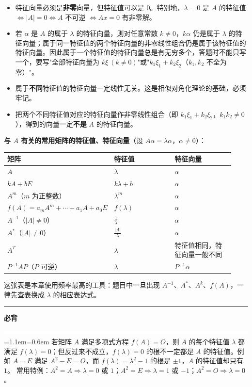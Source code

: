 \documentclass[11pt,openany,UTF8]{ctexbook}
\newcommand{\callouthead}[2]{%
  \par\addvspace{7pt}\noindent
  {\color{#1}\rule[-0.15em]{3pt}{1.05em}}\hspace{0.5em}%
  {\bfseries\color{#1}#2}\par\nobreak\vspace{-0.35em}%
  {\color{rulesep}\hrule height 0.4pt}\nobreak\vspace{0.45em}%
  \begingroup\small\setlength{\parindent}{0pt}%
  \leftskip=1.1em\rightskip=0.6em\noindent\ignorespaces}
\newcommand{\calloutend}{\par\endgroup\addvspace{7pt}}
\newenvironment{callkey}[1]{\callouthead{keybar}{#1}}{\calloutend}
\begin{document}
\begin{itemize}
\item 特征向量必须是\textbf{非零}向量，但特征值可以是 $0$。特别地，$\lambda=0$ 是 $A$ 的特征值 $\iff\vert A\vert=0\iff A$ 不可逆 $\iff Ax=0$ 有非零解。
\item 若 $\alpha$ 是 $A$ 的属于 $\lambda$ 的特征向量，则对任意常数 $k\neq0$，$k\alpha$ 仍是属于 $\lambda$ 的特征向量；属于同一特征值的两个特征向量的非零线性组合仍是属于该特征值的特征向量。因此属于一个特征值的特征向量总是有无穷多个，答题时不能只写一个，要写"全部特征向量为 $k\xi\ (k\neq0)$"或"$k_1\xi_1+k_2\xi_2$（$k_1,k_2$ 不全为零）"。
\item 属于\textbf{不同}特征值的特征向量一定线性无关。这是相似对角化理论的基础，必须牢记。
\item 把两个不同特征值对应的特征向量作非零线性组合（即 $k_1\xi_1+k_2\xi_2$，$k_1k_2\neq0$），得到的向量一定\textbf{不是} $A$ 的特征向量。
\end{itemize}
\textbf{与 $A$ 有关的常用矩阵的特征值、特征向量}（设 $A\alpha=\lambda\alpha$，$\alpha\neq0$）：

\begingroup\small\setlength{\tabcolsep}{4.0pt}
\begin{longtable}{@{}L{0.3095\linewidth}L{0.3095\linewidth}L{0.3095\linewidth}@{}}
\toprule
\textbf{矩阵} & \textbf{特征值} & \textbf{特征向量} \\
\midrule
\endhead
$A$ & $\lambda$ & $\alpha$ \\
$kA+bE$ & $k\lambda+b$ & $\alpha$ \\
$A^m$（$m$ 为正整数） & $\lambda^m$ & $\alpha$ \\
$f(A)=a_mA^m+\cdots+a_1A+a_0E$ & $f(\lambda)$ & $\alpha$ \\
$A^{-1}$（$\vert A\vert\neq0$） & $\frac{1}{\lambda}$ & $\alpha$ \\
$A^*$（$\vert A\vert\neq0$） & $\frac{\vert A\vert}{\lambda}$ & $\alpha$ \\
$A^T$ & $\lambda$ & 特征值相同，特征向量一般不同 \\
$P^{-1}AP$（$P$ 可逆） & $\lambda$ & $P^{-1}\alpha$ \\
\bottomrule
\end{longtable}
\endgroup

这张表是本章使用频率最高的工具：题目中一旦出现 $A^{-1}$、$A^*$、$A^k$、$f(A)$，一律先查表换成 $\lambda$ 的相应表达式。

\begin{callkey}{必背}
若矩阵 $A$ 满足多项式方程 $f(A)=O$，则 $A$ 的每个特征值 $\lambda$ 都满足 $f(\lambda)=0$；但反过来不成立，$f(\lambda)=0$ 的根不一定都是 $A$ 的特征值。例如 $A=E$ 满足 $A^2-E=O$，而 $f(\lambda)=\lambda^2-1$ 的根是 $\pm1$，$A$ 的特征值却只有 $1$。 常用特例：$A^2=A\Rightarrow\lambda=0$ 或 $1$；$A^2=E\Rightarrow\lambda=1$ 或 $-1$；$A^2=O\Rightarrow\lambda=0$。

\end{callkey}
\end{document}
